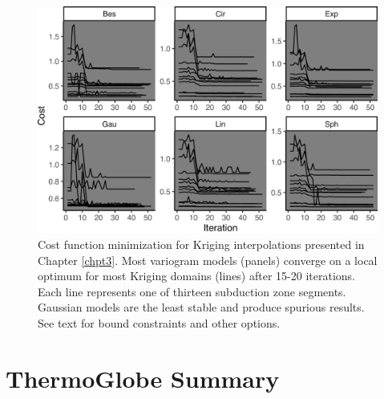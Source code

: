 \begin{figure}[htbp]

{\centering \includegraphics[width=1\linewidth,]{assets/figs/chpt3/optTrace} 

}

\caption[Cost function minimization for Kriging interpolations]{Cost function minimization for Kriging interpolations presented in Chapter \ref{chpt3}. Most variogram models (panels) converge on a local optimum for most Kriging domains (lines) after 15-20 iterations. Each line represents one of thirteen subduction zone segments. Gaussian models are the least stable and produce spurious results. See text for bound constraints and other options.}\label{fig:optTrace}
\end{figure}

\clearpage

\hypertarget{thermoglobe-summary}{%
\section{ThermoGlobe Summary}\label{thermoglobe-summary}}



